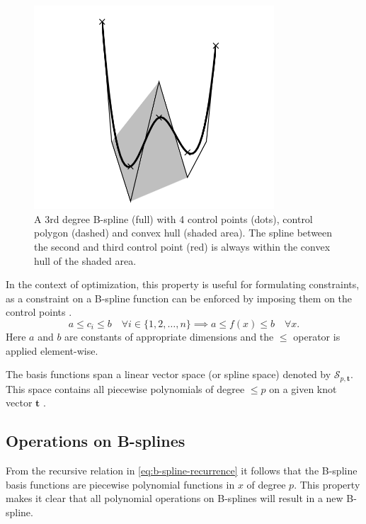 \begin{figure}
    \centering
    \includegraphics[width=0.8\textwidth]{fig/illustrations/convex-hull.png}
    \caption{A 3rd degree B-spline (full) with 4 control points (dots), control polygon (dashed) and convex hull (shaded area). The spline between the second and third control point (red) is always within the convex hull of the shaded area.}
    \label{fig:b-spline-convex-hull} 
\end{figure}

In the context of optimization, this property is useful for formulating constraints, as a constraint on a B-spline function can be enforced by imposing them on the control points \citep{mercy2017spline}. 
\begin{equation}
    a \leq c_i \leq b \quad \forall i\in\{1,2,\ldots,n\} \implies a \leq f(x) \leq b \quad \forall x.
\end{equation}
Here $a$ and $b$ are constants of appropriate dimensions and the $\leq$ operator is applied element-wise.

The basis functions span a linear vector space (or spline space) denoted by $\mathcal{S}_{p, \mathbf{t}}$. This space contains all piecewise polynomials of degree $\le p$ on a given knot vector $\mathbf t$ \citep{Grimstad2016}. 

\subsection{Operations on B-splines}
From the recursive relation in \cref{eq:b-spline-recurrence} it follows that the B-spline basis functions are piecewise polynomial functions in $x$ of degree $p$. This property makes it clear that all polynomial operations on B-splines will result in a new B-spline.

